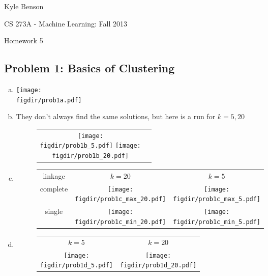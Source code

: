 \documentclass[twoside,11pt]{article}
\newcommand{\figdir}{figs}
\theoremstyle{definition}
\begin{document}
\centerline{\Large Kyle Benson}
\centerline{CS 273A - Machine Learning: Fall 2013}
\centerline{Homework 5}

\subsection*{Problem 1: Basics of Clustering}

\begin{enumerate}[(a)]

\item \vspace{-1in}\texttt{[image: \\figdir/prob1a.pdf]}

\item They don't always find the same solutions, but here is a run for $k={5,20}$
\vspace{-1in}
\begin{figure}[h!] \centering
\begin{tabular}[c]{cc}
\texttt{[image: \\figdir/prob1b\_5.pdf]}
\texttt{[image: \\figdir/prob1b\_20.pdf]}
\end{tabular}
\end{figure}

\vspace{3in} %

\item
\begin{figure}[h!] \centering
\begin{tabular}[t]{c|c|c}

linkage & $k=20$ & $k=5$ \\

complete  &\texttt{[image: \\figdir/prob1c\_max\_20.pdf]} & \texttt{[image: \\figdir/prob1c\_max\_5.pdf]}
\\

single &
\texttt{[image: \\figdir/prob1c\_min\_20.pdf]} &
\texttt{[image: \\figdir/prob1c\_min\_5.pdf]}
\end{tabular}
\end{figure}

\item
\begin{figure}[h!] \centering
\begin{tabular}{cc}
$k=5$ & $k=20$ \\
\texttt{[image: \\figdir/prob1d\_5.pdf]} &
\texttt{[image: \\figdir/prob1d\_20.pdf]}
\end{tabular}
\end{figure}


\end{enumerate}
\end{document}
